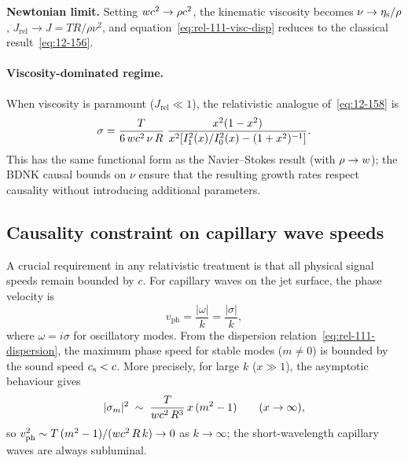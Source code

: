 \begin{relcorrection}
\textbf{Newtonian limit.}
Setting $w c^{2} \to \rho c^{2}$, the kinematic viscosity
becomes $\nu \to \eta_{\mathrm{s}}/\rho$,
$J_{\mathrm{rel}} \to J = TR/\rho\nu^{2}$, and
equation~\eqref{eq:rel-111-visc-disp}
reduces to the classical result~\eqref{eq:12-156}.
\end{relcorrection}

\paragraph{Viscosity-dominated regime.}
When viscosity is paramount ($J_{\mathrm{rel}} \ll 1$), the
relativistic analogue of~\eqref{eq:12-158} is
\begin{equation}
\label{eq:rel-111-visc-dominant}
\sigma = \frac{T}{6\,w c^{2}\,\nu\,R}\;
  \frac{x^{2}(1-x^{2})}{x^{2}[I_{1}^{2}(x)/I_{0}^{2}(x)
  - (1+x^{2})^{-1}]}.
\end{equation}
This has the same functional form as the Navier--Stokes result (with
$\rho \to w$); the BDNK causal bounds on $\nu$ ensure that
the resulting growth rates respect causality without introducing
additional parameters.

\subsection{Causality constraint on capillary wave speeds}
\label{sec:rel-111-causality}

A crucial requirement in any relativistic treatment is that all
physical signal speeds remain bounded by $c$.  For capillary waves
on the jet surface, the phase velocity is
\begin{equation}
\label{eq:rel-111-vphase}
v_{\mathrm{ph}} = \frac{|\omega|}{k}
  = \frac{|\sigma|}{k},
\end{equation}
where $\omega = i\sigma$ for oscillatory modes.  From the
dispersion relation~\eqref{eq:rel-111-dispersion}, the maximum
phase speed for stable modes ($m \neq 0$) is bounded by the
sound speed $c_{\mathrm{s}} < c$.  More precisely, for large $k$ ($x \gg 1$),
the asymptotic behaviour gives
\begin{equation}
\label{eq:rel-111-asymptotic}
|\sigma_{m}|^{2} \;\sim\;
  \frac{T}{w c^{2}\,R^{3}}\,x\,(m^{2}-1)
  \qquad (x \to \infty),
\end{equation}
so $v_{\mathrm{ph}}^{2} \sim T\,(m^{2}-1)/
(w c^{2}\,R\,k) \to 0$ as $k\to\infty$;
the short-wavelength capillary waves are always subluminal.

